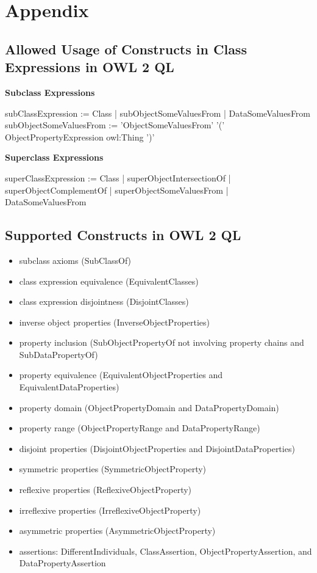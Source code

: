 \documentclass{llncs}
\begin{document}
\section{Appendix}


\subsection{Allowed Usage of Constructs in Class Expressions in OWL 2 QL}

\textbf{Subclass Expressions}

\begin{ex}
subClassExpression :=
    Class |
    subObjectSomeValuesFrom | DataSomeValuesFrom
subObjectSomeValuesFrom := 'ObjectSomeValuesFrom' '(' ObjectPropertyExpression owl:Thing ')'
\end{ex}

\textbf{Superclass Expressions}

\begin{ex}
superClassExpression :=
    Class |
    superObjectIntersectionOf | superObjectComplementOf |
    superObjectSomeValuesFrom | DataSomeValuesFrom
\end{ex}
 
\subsection{Supported Constructs in OWL 2 QL}

\begin{itemize}
	\item subclass axioms (SubClassOf)
  \item class expression equivalence (EquivalentClasses)
  \item class expression disjointness (DisjointClasses)
  \item inverse object properties (InverseObjectProperties)
  \item property inclusion (SubObjectPropertyOf not involving property chains and SubDataPropertyOf)
  \item property equivalence (EquivalentObjectProperties and EquivalentDataProperties)
  \item property domain (ObjectPropertyDomain and DataPropertyDomain)
  \item property range (ObjectPropertyRange and DataPropertyRange)
  \item disjoint properties (DisjointObjectProperties and DisjointDataProperties)
  \item symmetric properties (SymmetricObjectProperty)
  \item reflexive properties (ReflexiveObjectProperty)
  \item irreflexive properties (IrreflexiveObjectProperty)
  \item asymmetric properties (AsymmetricObjectProperty)
  \item assertions: DifferentIndividuals, ClassAssertion, ObjectPropertyAssertion, and DataPropertyAssertion
\end{itemize}
\end{document}
